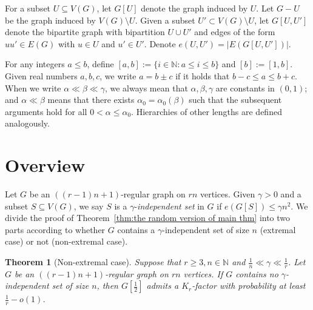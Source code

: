 \documentclass[11pt, a4paper]{article}
\newtheorem{theorem}{Theorem}[section]
\theoremstyle{definition}
\newcommand{\<}{\subseteq}
\begin{document}
For a subset \(U\subseteq V(G)\), let \(G[U]\) denote the graph induced by \(U\). Let \(G-U\) be the graph induced by \(V(G)\setminus U\). %
Given a subset {\(U'\subset V(G)\setminus U\)}, let \(G[U,U']\) denote the bipartite graph with bipartition \(U\cup U'\) and edges of the form \(uu'\in E(G)\) with \(u\in U\) and \(u'\in U'\). Denote $e(U,U')=|E(G[U,U'])|$. %

For any integers $a\leq b$, define $[a,b]:=\{i\in \mathbb{N}:a\leq i\leq b\}$ and $[b]:=[1,b]$. Given real numbers $a,b,c$, we write $a=b\pm c$ if it holds that $b-c\leq a\leq b+c$. When we write  $\alpha\ll \beta\ll \gamma$, we always mean that $\alpha, \beta, \gamma$  are constants in $(0,1)$; and $\alpha\ll \beta$ means that there exists $\alpha_0=\alpha_0(\beta)$ such that the subsequent arguments hold for all $0<\alpha\leq \alpha_0$. Hierarchies of other lengths are defined analogously. 



\section{Overview}
Let $G$ be an $((r-1)n+1)$-regular graph on $rn$ vertices. Given $\gamma>0$ and a subset $S\subseteq V(G)$, we say $S$ is a $\gamma$-\textit{independent set} in $G$ if $e(G[S])\leq \gamma n^2$.  We divide the proof of Theorem~\ref{thm:the random version of main thm} into two parts according to whether $G$ contains a $\gamma$-independent set of size $n$ (extremal case) or not (non-extremal case). 

\begin{theorem}[Non-extremal case]\label{thm:Non-extremal case}
Suppose that $r\geq 3, n\in \mathbb{N}$ and $\frac{1}{n}\ll \gamma \ll \frac{1}{r}$. Let $G$ be an $((r-1)n+1)$-regular graph on $rn$ vertices. If $G$ contains no $\gamma$-independent set of size $n$, then $G[\frac{1}{2}]$ admits a $K_r$-factor with probability at least $\frac{1}{r}-o(1)$.
\end{theorem}
\end{document}

